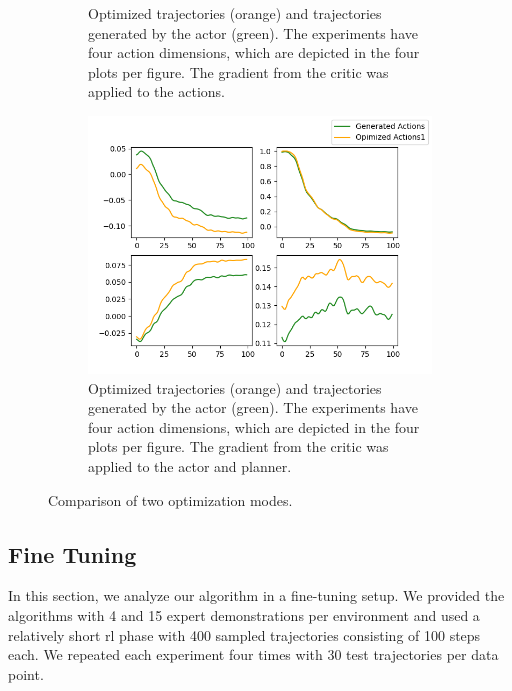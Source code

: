 \begin{figure}[htbp]
\begin{subfigure}[t]{0.45\textwidth}
      \caption{Optimized trajectories (orange) and trajectories generated by the actor (green). 
      The experiments have four action dimensions, which are depicted in the 
      four plots per figure. 
      The gradient from the critic was applied to the actions.}
      \label{fig:direct_actions}
    \end{subfigure}
    \hfill
    \begin{subfigure}[t]{0.45\textwidth}
      \includegraphics[width=\textwidth]{images/Plan_vs_Actions/changes/plans_actor_0.png}
      \caption{Optimized trajectories (orange) and trajectories generated by the actor (green). 
      The experiments have four action dimensions, which are depicted in the 
      four plots per figure. The gradient from the critic was applied to the actor and planner.}
      \label{fig:ac_pl_actions}
    \end{subfigure}
    \caption{Comparison of two optimization modes.}
    \label{fig:action_vs_actor}
\end{figure}

\subsection{Fine Tuning}
\label{sec:fine_tuning}
In this section, we analyze our algorithm in a fine-tuning setup. We provided the algorithms with 4 and 15 expert demonstrations per 
environment and used a relatively short \ac{rl} phase with 400 sampled trajectories consisting of 100 steps each. We 
repeated each experiment four times with 30 test trajectories per data point.\\

